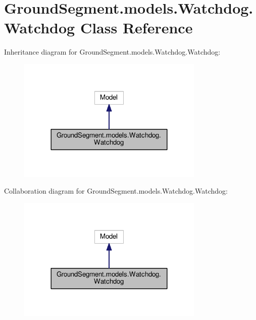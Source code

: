 \hypertarget{class_ground_segment_1_1models_1_1_watchdog_1_1_watchdog}{}\section{Ground\+Segment.\+models.\+Watchdog.\+Watchdog Class Reference}
\label{class_ground_segment_1_1models_1_1_watchdog_1_1_watchdog}


Inheritance diagram for Ground\+Segment.\+models.\+Watchdog.\+Watchdog\+:\nopagebreak
\begin{figure}[H]
\begin{center}
\leavevmode
\includegraphics[width=252pt]{class_ground_segment_1_1models_1_1_watchdog_1_1_watchdog__inherit__graph}
\end{center}
\end{figure}


Collaboration diagram for Ground\+Segment.\+models.\+Watchdog.\+Watchdog\+:\nopagebreak
\begin{figure}[H]
\begin{center}
\leavevmode
\includegraphics[width=252pt]{class_ground_segment_1_1models_1_1_watchdog_1_1_watchdog__coll__graph}
\end{center}
\end{figure}

